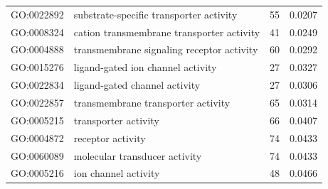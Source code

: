 \documentclass[10pt,letterpaper]{article}
\begin{document}
\begin{table}[]
\begin{tabular}{llcc}
GO:0022892                                 & substrate-specific transporter activity                    & 55                                                                                       & 0.0207                                \\
GO:0008324                                 & cation transmembrane transporter activity                  & 41                                                                                       & 0.0249                                \\
GO:0004888                                 & transmembrane signaling receptor activity                  & 60                                                                                       & 0.0292                                \\
GO:0015276                                 & ligand-gated ion channel activity                          & 27                                                                                       & 0.0327                                \\
GO:0022834                                 & ligand-gated channel activity                              & 27                                                                                       & 0.0306                                \\
GO:0022857                                 & transmembrane transporter activity                         & 65                                                                                       & 0.0314                                \\
GO:0005215                                 & transporter activity                                       & 66                                                                                       & 0.0407                                \\
GO:0004872                                 & receptor activity                                          & 74                                                                                       & 0.0433                                \\
GO:0060089                                 & molecular transducer activity                              & 74                                                                                       & 0.0433                                \\
GO:0005216                                 & ion channel activity                                       & 48                                                                                       & 0.0466                                \\

\end{tabular}
\end{table}
\end{document}
